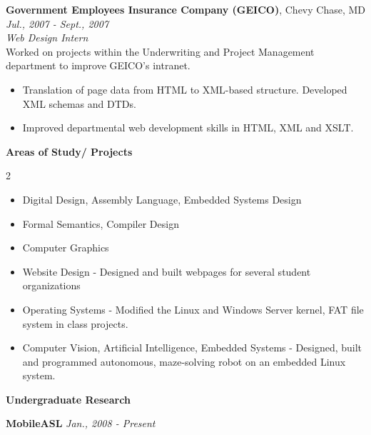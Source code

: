 \documentclass[9pt]{article}
\newcommand{\mysectiontitle}[1]{ { { \large{\textbf{#1} } } \vspace{0.02in}} }
\newcommand{\smallvspace}{\vspace{0.1cm}}
\newenvironment{changemargin}[2]{%
  \begin{list}{}{%
    \setlength{\topsep}{0pt}%
    \setlength{\leftmargin}{#1}%
    \setlength{\rightmargin}{#2}%
    \setlength{\listparindent}{\parindent}%
    \setlength{\itemindent}{\parindent}%
    \setlength{\parsep}{\parskip}%
  }%
  \item[]}{\end{list}}
\begin{document}
\begin{changemargin}{1cm}{0.5cm}
\begin{changemargin}{0.5cm}{0.5cm}
      \smallvspace
      {\textbf{Government Employees Insurance Company (GEICO)}}, Chevy Chase, MD \hfill \textit{Jul., 2007 - Sept., 2007} \\
      
      \textit{Web Design Intern} \\
      Worked on projects within the Underwriting and Project Management
      department to improve GEICO's intranet. \\
      \begin{itemize}
        \item Translation of page data from HTML to XML-based structure. Developed XML schemas and DTDs.
        \item Improved departmental web development skills in HTML, XML and XSLT.
      \end{itemize}
    \end{changemargin}
    
    
    \vspace{0.5em}
    \mysectiontitle{Areas of Study/ Projects}
    \vspace{-0.5em}
    \begin{multicols}{2}    
      \begin{itemize}
        \itemsep -1px
        \item Digital Design, Assembly Language, Embedded Systems Design
        \item Formal Semantics, Compiler Design
        \item Computer Graphics
        \item Website Design - Designed and built webpages for several student organizations
        \vspace{0.5em}
        \item Operating Systems - Modified the Linux and Windows Server kernel, FAT file system in class projects.
        \item Computer Vision, Artificial Intelligence, Embedded Systems - Designed, built and programmed autonomous, maze-solving 
              robot on an embedded Linux system.
      \end{itemize}
    \end{multicols}
    
    
    \vspace{-0.5em}
    \mysectiontitle{Undergraduate Research}
    \begin{changemargin}{0.5cm}{0.5cm}
      {\textbf{MobileASL}} \hfill \textit{Jan., 2008 - Present} \\
      

\end{changemargin}
\end{changemargin}
\end{document}
